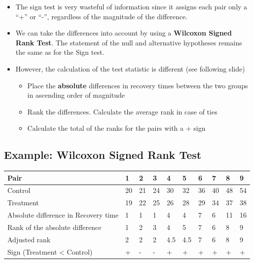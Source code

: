 \documentclass[
]{book}
\providecommand{\tightlist}{%
  \setlength{\itemsep}{0pt}\setlength{\parskip}{0pt}}
\begin{document}
\begin{itemize}
\tightlist
\item
  The sign test is very wasteful of information since it assigns each pair only a ``+'' or ``-'', regardless of the magnitude of the difference.
\item
  We can take the differences into account by using a \textbf{Wilcoxon Signed Rank Test}. The statement of the null and alternative hypotheses remains the same as for the Sign test.
\item
  However, the calculation of the test statistic is different (see following slide)

  \begin{itemize}
  \tightlist
  \item
    Place the \textbf{absolute} differences in recovery times between the two groups in ascending order of magnitude
  \item
    Rank the differences. Calculate the average rank in case of ties
  \item
    Calculate the total of the ranks for the pairs with a + sign
  \end{itemize}
\end{itemize}

\hypertarget{example-wilcoxon-signed-rank-test}{%
\subsection{Example: Wilcoxon Signed Rank Test}\label{example-wilcoxon-signed-rank-test}}

\begin{tabular}{l|l|l|l|l|l|l|l|l|l}
\hline
Pair &  1 &  2 &  3 &  4 &  5 &  6 &  7 &  8 &  9\\
\hline
Control & 20 & 21 & 24 & 30 & 32 & 36 & 40 & 48 & 54\\
\hline
Treatment & 19 & 22 & 25 & 26 & 28 & 29 & 34 & 37 & 38\\
\hline
Absolute difference in Recovery time & 1 & 1 & 1 & 4 & 4 & 7 & 6 & 11 & 16\\
\hline
Rank of the absolute difference & 1 & 2 & 3 & 4 & 5 & 7 & 6 & 8 & 9\\
\hline
Adjusted rank & 2 & 2 & 2 & 4.5 & 4.5 & 7 & 6 & 8 & 9\\
\hline
Sign (Treatment < Control) & + & - & - & + & + & + & + & + & +\\
\hline
\end{tabular}
\end{document}
